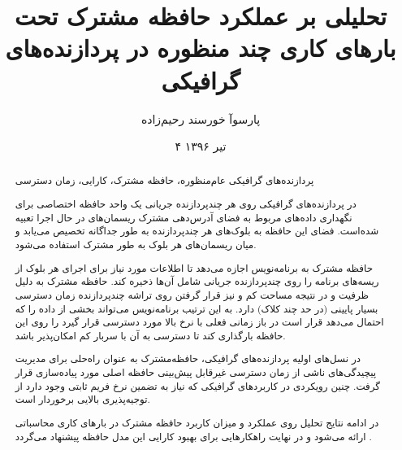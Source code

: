 \documentclass{thesis}
\begin{document}
\date{
۴ تیر ۱۳۹۶
}
\title{
تحلیلی بر عملکرد حافظه مشترک تحت بارهای کاری چند منظوره در پردازنده‌های گرافیکی
}
\author{
پارسوآ خورسند رحیم‌زاده
}
\subject{%
مهندسی نرم‌افزار
}
\frontmatter \makethesistitle \pagestyle{empty} \baselineskip
\begin{abstract}
{%
پردازنده‌های گرافیکی عام‌منظوره، حافظه مشترک، کارایی، زمان دسترسی
}
{%
در پردازنده‌های گرافیکی روی هر چند‌پردازنده جریانی
یک واحد حافظه اختصاصی برای نگهداری داده‌های مربوط به فضای آدرس‌دهی مشترک 
ریسمان‌های در حال اجرا تعبیه شده‌است. فضای این حافظه به بلوک‌های هر چندپردازنده
به
طور
جداگانه تخصیص می‌یابد و میان ریسمان‌های
 هر بلوک به طور مشترک استفاده می‌شود.

حافظه مشترک
 به برنامه‌نویس اجازه می‌دهد تا اطلاعات مورد نیاز برای اجرای هر بلوک از
ریسه‌های برنامه را روی چندپردازنده‌ جریانی شامل آن‌ها ذخیره کند. حافظه مشترک به
دلیل ظرفیت و در نتیجه مساحت کم و نیز قرار گرفتن روی تراشه چند‌پردازنده زمان
دسترسی بسیار پایینی (در حد چند کلاک) دارد. به این ترتیب برنامه‌نویس می‌تواند
بخشی از داده را که احتمال می‌دهد قرار است در باز زمانی فعلی با نرخ بالا مورد
دسترسی قرار گیرد را روی این حافظه بارگذاری
  کند تا دسترسی به آن با سربار کم امکان‌پذیر باشد. 
  
  
  در نسل‌های اولیه پردازنده‌های گرافیکی، حافظه‌مشترک به عنوان راه‌حلی برای
مدیریت پیچیدگی‌های ناشی از زمان دسترسی غیر‌قابل پیش‌بینی حافظه‌ اصلی مورد
پیاده‌سازی قرار گرفت. چنین رویکردی در کاربرد‌های گرافیکی که نیاز به تضمین نرخ
فریم
ثابتی وجود دارد از توجیه‌پذیری بالایی برخوردار است.

در ادامه نتایج تحلیل روی عملکرد و میزان کاربرد حافظه مشترک در بارهای کاری
محاسباتی ارائه می‌شود و در نهایت راهکار‌هایی برای بهبود کارایی 
این مدل حافظه پیشنهاد می‌گردد
.
}
\end{abstract}
\end{document}
